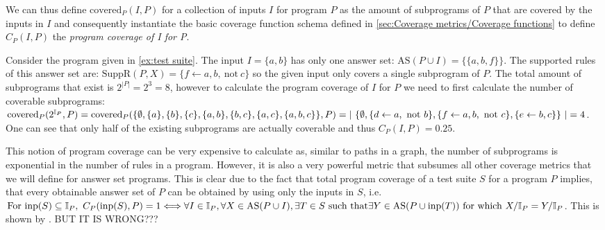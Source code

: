 We can thus define \(\text{covered}_P(I, P)\) for a collection of inputs $I$ for program $P$ as the amount of subprograms of $P$ that are covered by the inputs in $I$ and consequently instantiate the basic coverage function schema defined in \cref{sec:Coverage metrics/Coverage functions} to define \(C_P(I, P)\) the \emph{program coverage of I for P}.

\begin{example}
\label{ex:program coverage}
    Consider the program given in \cref{ex:test suite}. The input \(I = \{a, b\}\) has only one answer set: \(\text{AS}(P \cup I) = \{\{a, b, f\}\}\). The supported rules of this answer set are: \(\text{SuppR}(P, X) = \{f \leftarrow a, b,\ \text{not}\ c\}\) so the given input only covers a single subprogram of $P$. The total amount of subprograms that exist is \(2^{|P|} = 2^3 = 8\), however to calculate the program coverage of $I$ for $P$ we need to first calculate the number of coverable subprograms: \(\text{covered}_P(2^{\mathbb{I}_P},P) = \text{covered}_P(\{\emptyset, \{a\}, \{b\}, \{c\}, \{a, b\}, \{b, c\}, \{a, c\}, \\ \{a, b, c\}\},P) = |\ \{\emptyset, \{d \leftarrow a,\ \text{not}\ b\}, \{f \leftarrow a, b,\ \text{not}\ c\}, \{e \leftarrow b, c\}\}\ | = 4\). One can see that only half of the existing subprograms are actually coverable and thus \(C_P(I, P) = 0.25\).
\end{example}

This notion of program coverage can be very expensive to calculate as, similar to paths in a graph, the number of subprograms is exponential in the number of rules in a program. However, it is also a very powerful metric that subsumes all other coverage metrics that we will define for answer set programs. This is clear due to the fact that total program coverage of a test suite $S$ for a program $P$ implies, that every obtainable answer set of $P$ can be obtained by using only the inputs in $S$, i.e. 
\(
    \text{For inp}(S) \subseteq \mathbb{I}_P,\ C_P(\text{inp}(S),P) = 1 \Longleftrightarrow \forall I \in \mathbb{I}_P, \forall X \in \text{AS}(P \cup I), \exists T \in S \ \text{such that} \\ \exists Y \in \text{AS}(P \cup \text{inp}(T))\ \text{for which}\ X / \mathbb{I}_P = Y / \mathbb{I}_P
\).
This is shown by \textcite[in theorem 2]{Jan+10}. BUT IT IS WRONG???

